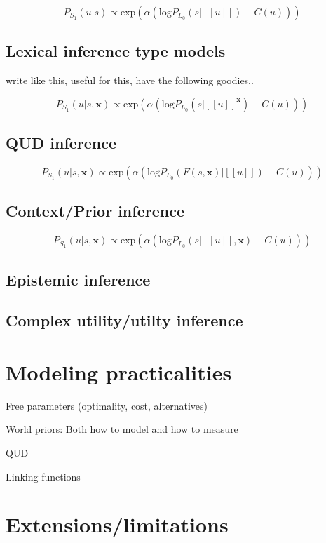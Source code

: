 \documentclass{sp}
\newcommand{\sem}[1]{\ensuremath{[\![#1]\!]}}
\begin{document}
$$P_{S_1}(u|s) \propto \textrm{exp}(\alpha (\textrm{log}P_{L_0}(s|\sem{u}) - C(u)))$$

\subsection{Lexical inference type models}

write like this, useful for this, have the following goodies..

$$P_{S_1}(u|s, \textbf{x}) \propto \textrm{exp}(\alpha (\textrm{log}P_{L_0}(s|\sem{u}^{\textbf{x}}) - C(u)))$$


\subsection{QUD inference}

$$P_{S_1}(u|s, \textbf{x}) \propto \textrm{exp}(\alpha (\textrm{log}P_{L_0}(F(s,\textbf{x})|\sem{u}) - C(u)))$$

\subsection{Context/Prior inference}

$$P_{S_1}(u|s, \textbf{x}) \propto \textrm{exp}(\alpha (\textrm{log}P_{L_0}(s|\sem{u}, \textbf{x}) - C(u)))$$

\subsection{Epistemic inference}

\subsection{Complex utility/utilty inference}

\section{Modeling practicalities} \label{practicalities}

Free parameters (optimality, cost, alternatives)

World priors: Both how to model and how to measure

QUD

Linking functions

\section{Extensions/limitations} \label{limitations}
\end{document}
